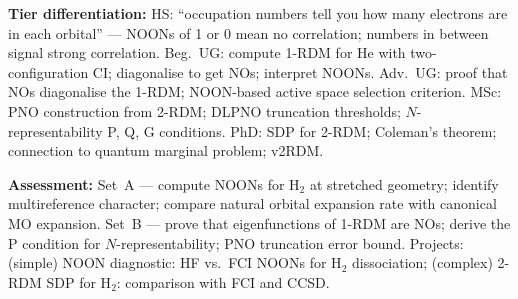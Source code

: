 \documentclass[11pt,a4paper]{article}
\begin{document}
\begin{tcolorbox}[modulebox, title={Module~II.1 / L09: Natural Orbitals and the One-Particle Density Matrix}]
\medskip\textbf{Tier differentiation:}
HS: ``occupation numbers tell you how many electrons are in each orbital'' ---
NOONs of 1 or 0 mean no correlation; numbers in between signal strong correlation.
Beg.\ UG: compute 1-RDM for He with two-configuration CI; diagonalise to get NOs; interpret NOONs.
Adv.\ UG: proof that NOs diagonalise the 1-RDM; NOON-based active space selection criterion.
MSc: PNO construction from 2-RDM; DLPNO truncation thresholds; $N$-representability P, Q, G conditions.
PhD: SDP for 2-RDM; Coleman's theorem; connection to quantum marginal problem; v2RDM.

\medskip\textbf{Assessment:}
Set~A --- compute NOONs for H$_2$ at stretched geometry; identify multireference character;
compare natural orbital expansion rate with canonical MO expansion.
Set~B --- prove that eigenfunctions of 1-RDM are NOs; derive the P condition for $N$-representability;
PNO truncation error bound.
Projects: (simple) NOON diagnostic: HF vs.\ FCI NOONs for H$_2$ dissociation;
(complex) 2-RDM SDP for H$_2$: comparison with FCI and CCSD.
\end{tcolorbox}

\medskip
\end{document}
